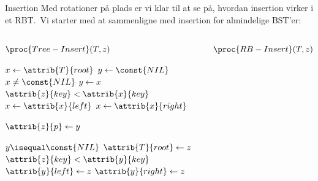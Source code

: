 \documentclass[aspectratio=1610]{beamer}
\begin{document}
\begin{frame}{Insertion}{}
    Med rotationer på plads er vi klar til at se på, hvordan insertion virker i
    et RBT.\ Vi starter med at sammenligne med insertion for almindelige BST'er:

    \begin{columns}[t]
        \scriptsize

         \begin{block}{$\proc{Tree-Insert}(T,z)$}
        
            \vspace{-\abovedisplayskip}
            \begin{codebox}
                \li $x \gets \attrib{T}{root}$ 
                \li $y \gets \const{NIL}$ 
                \li \While $x \neq \const{NIL}$  
                    \Do
                \li     $y \gets x$ 
                \li     \If  $\attrib{z}{key} < \attrib{x}{key}$ 
                        \Then
                \li         $x \gets \attrib{x}{left}$
                \li     \Else $x \gets \attrib{x}{right}$
                        \End
                    \End

                \li $\attrib{z}{p} \gets y$ 

                \li \If $y \isequal \const{NIL}$ 
                    \Then
                \li     $\attrib{T}{root} \gets z$ 
                \li \ElseIf $\attrib{z}{key} < \attrib{y}{key}$ 
                    \Then
                \li     $\attrib{y}{left} \gets z$
                \li \Else $\attrib{y}{right} \gets z$
                    \End
                \li
                \li
                \li
                \li
            \end{codebox}
        \end{block}       
    
        \begin{block}{$\proc{RB-Insert}(T,z)$}
        

\end{block}
\end{columns}
\end{frame}
\end{document}
